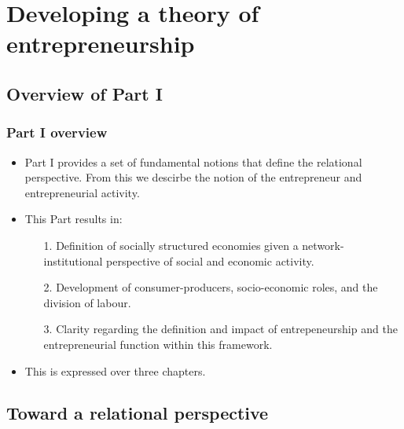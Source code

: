 \documentclass[10pt]{beamer}
\begin{document}
\section{Developing a theory of entrepreneurship}

\subsection{Overview of Part I}

\begin{frame} \frametitle{Part I overview}
\begin{itemize}
\item Part I provides a set of fundamental notions that define the relational perspective. From this we descirbe the notion of the entrepreneur and entrepreneurial activity.
\medskip
\item This Part results in:
\begin{itemize}
\medskip
\item[1.] Definition of socially structured economies given a network-institutional perspective of social and economic activity.
\medskip
\item[2.] Development of consumer-producers, socio-economic roles, and the division of labour.
\medskip
\item[3.] Clarity regarding the definition and impact of entrepeneurship and the entrepreneurial function within this framework.
\end{itemize}
\medskip
\item This is expressed over three chapters.
\end{itemize}
\end{frame}

\subsection{Toward a relational perspective}
\end{document}
